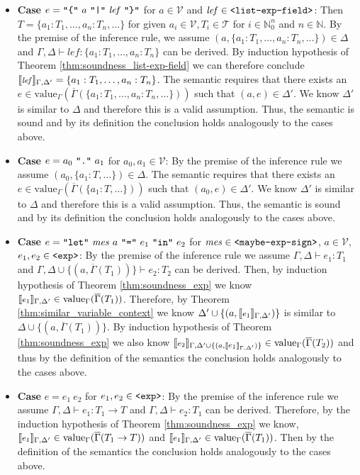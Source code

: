 \documentclass[]{scrbook}
\newcommand{\mf}[1]{\text{\texttt{#1}}}
\newcommand{\semantic}[1]{\llbracket \text{\footnotesize\texttt{#1}} \rrbracket}
\theoremstyle{definition}
\theoremstyle{definition}
\theoremstyle{definition}
\theoremstyle{remark}
\begin{document}
\begin{itemize}
\item\textbf{Case} $e = \mf{"\{"} \ a \ \mf{"|"} \ \mathit{lef} \ \mf{"\}"}$ for $a\in\mathcal{V}$ and $\mathit{lef}\in\mf{<list-exp-field>}$: Then $T=\{a_1:T_1,\dots, a_n:T_n,\dots\}$ for given $a_i\in\mathcal{V},T_i\in\mathcal{T}$ for $i\in\mathbb{N}_0^n$ and $n\in\mathbb{N}$. By the premise of the inference rule, we assume $(a,\{a_1:T_1,\dots, a_n:T_n,\dots\})\in\Delta$ and $\Gamma,\Delta\vdash \mathit{lef}:\{a_1:T_1,\dots, a_n:T_n\}$ can be derived. By induction hypothesis of Theorem \ref{thm:soundness_list-exp-field} we can therefore conclude \(\semantic{$\mathit{lef}$}_{\Gamma,\Delta'}=\{a_1:T_1,\dots,a_n:T_n\}\). The semantic requires that there exists an $e\in\text{value}_\Gamma(\overline{\Gamma}(\{a_1:T_1,\dots, a_n:T_n,\dots\}))$ such that $(a,e)\in\Delta'$. We know $\Delta'$ is similar to $\Delta$ and therefore this is a valid assumption. Thus, the semantic is sound and by its definition the conclusion holds analogously to the cases above.
\item\textbf{Case} $e = a_0 \ \mf{"."} \ a_1$ for $a_0,a_1\in\mathcal{V}$: By the premise of the inference rule we assume $(a_0,\{a_1:T,\dots\})\in\Delta$. The semantic requires that there exists an $e\in\text{value}_\Gamma(\overline{\Gamma}(\{a_1:T,\dots\}))$ such that $(a_0,e)\in\Delta'$. We know $\Delta'$ is similar to $\Delta$ and therefore this is a valid assumption. Thus, the semantic is sound and by its definition the conclusion holds analogously to the cases above.
\item\textbf{Case} $e = \mf{"let"} \ \mathit{mes} \ a \ \mf{"="} \ e_1 \ \mf{"in"} \ e_2$ for $\mathit{mes}\in\mf{<maybe-exp-sign>}$, $a\in\mathcal{V}$, $e_1,e_2\in\mf{<exp>}$: By the premise of the inference rule we assume $\Gamma,\Delta\vdash e_1:T_1$ and $\Gamma,\Delta\cup\{(a,\overline{\Gamma}(T_1))\}\vdash e_2:T_2$ can be derived. Then, by induction hypothesis of Theorem \ref{thm:soundness_exp} we know \(\semantic{$e_1$}_{\Gamma,\Delta'}\in\text{value}_\Gamma(\overline{\Gamma}(T_1))\). Therefore, by Theorem \ref{thm:similar_variable_context} we know $\Delta'\cup\{(a,\semantic{$e_1$}_{\Gamma,\Delta'})\}$ is similar to $\Delta\cup\{(a,\overline{\Gamma}(T_1))\}$. By induction hypothesis of Theorem \ref{thm:soundness_exp} we also know \(\semantic{$e_2$}_{\Gamma,\Delta'\cup\{(a,\semantic{$e_1$}_{\Gamma,\Delta'})\}}\in\text{value}_\Gamma(\overline{\Gamma}(T_2))\) and thus by the definition of the semantics the conclusion holds analogously to the cases above.
\item\textbf{Case} $e= e_1 \ e_2$ for $e_1,e_2\in\mf{<exp>}$: By the premise of the inference rule we assume $\Gamma,\Delta\vdash e_1: T_1\to T$ and $\Gamma,\Delta\vdash e_2: T_1$ can be derived. Therefore, by the induction hypothesis of Theorem \ref{thm:soundness_exp} we know, \(\semantic{$e_1$}_{\Gamma,\Delta'}\in\text{value}_\Gamma(\overline{\Gamma}(T_1\to T))\) and \(\semantic{$e_1$}_{\Gamma,\Delta'}\in\text{value}_\Gamma(\overline{\Gamma}(T_1))\). Then by the definition of the semantics the conclusion holds analogously to the cases above.

\end{itemize}
\end{document}
